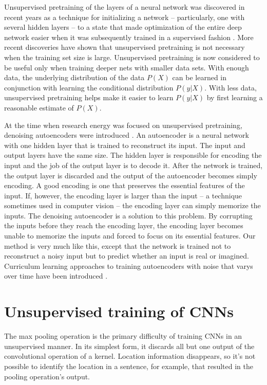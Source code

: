 Unsupervised pretraining of the layers of a neural network
was discovered in recent years as a technique for initializing
a network -- particularly, one with several hidden layers --
to a state that made optimization of the entire deep network
easier when it was subsequently trained in a supervised fashion
\cite{Hinton2006-mm,Hinton2006-rt,Erhan2010-mu,Larochelle2009-ml,Bengio2007-jn,Rifai2011-ng}.
More recent discoveries have shown that unsupervised pretraining is not
necessary when the training set size is large.  Unsupervised pretraining
is now considered to be useful only when training deeper nets with
smaller data sets.  With enough data, the underlying distribution of the
data $P(X)$ can be learned in conjunction with learning the conditional
distribution $P(y | X)$.  With less data, unsupervised pretraining helps
make it easier to learn $P(y | X)$ by first learning a reasonable estimate
of $P(X)$.

At the time when research energy was focused on unsupervised pretraining,
denoising autoencoders were introduced \cite{Vincent2008-yj}.
An autoencoder is a neural network with one hidden layer that is trained
to reconstruct its input.  The input and output layers have the same
size.  The hidden layer is responsible for encoding the input and the
job of the output layer is to decode it.  After the network is trained,
the output layer is discarded and the output of the autoencoder becomes
simply encoding.  A good encoding is one that preserves the essential
features of the input.  If, however, the encoding layer is larger than the
input -- a technique sometimes used in computer vision -- the encoding
layer can simply memorize the inputs.  The denoising autoencoder is a
solution to this problem.  By corrupting the inputs before they reach the
encoding layer, the encoding layer becomes unable to memorize the inputs
and forced to focus on its essential features.  Our method is very much
like this, except that the network is trained not to reconstruct a noisy
input but to predict whether an input is real or imagined.  Curriculum
learning approaches to training autoencoders with noise that varys over
time have been introduced \cite{Geras2014-fp,Chandra2014-et}.

\section{Unsupervised training of CNNs}

The max pooling operation is the primary difficulty of training CNNs in
an unsupervised manner.  In its simplest form, it discards all but one
output of the convolutional operation of a kernel.  Location information
disappears, so it's not possible to identify the location in a sentence,
for example, that resulted in the pooling operation's output.

